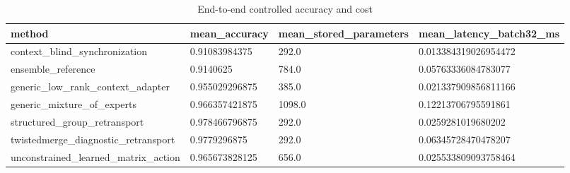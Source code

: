 \begin{table}[t]
\centering
\caption{End-to-end controlled accuracy and cost}
\begin{tabular}{llll}
\toprule
method & mean\_accuracy & mean\_stored\_parameters & mean\_latency\_batch32\_ms \\
\midrule
context\_blind\_synchronization & 0.91083984375 & 292.0 & 0.013384319026954472 \\
ensemble\_reference & 0.9140625 & 784.0 & 0.05763336084783077 \\
generic\_low\_rank\_context\_adapter & 0.955029296875 & 385.0 & 0.021337909856811166 \\
generic\_mixture\_of\_experts & 0.966357421875 & 1098.0 & 0.12213706795591861 \\
structured\_group\_retransport & 0.978466796875 & 292.0 & 0.0259281019680202 \\
twistedmerge\_diagnostic\_retransport & 0.9779296875 & 292.0 & 0.06345728470478207 \\
unconstrained\_learned\_matrix\_action & 0.965673828125 & 656.0 & 0.025533809093758464 \\
\bottomrule
\end{tabular}
\end{table}
